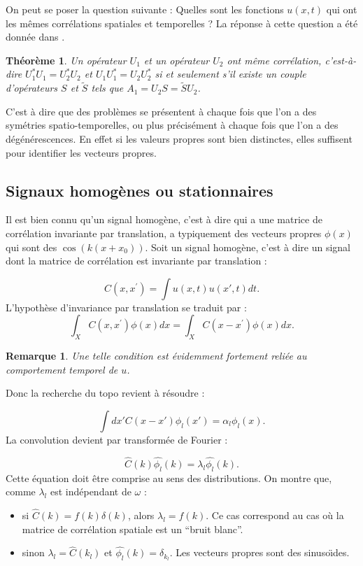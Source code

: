\documentclass{book}
\newtheorem{thm}{Th\'eor\`eme}[chapter]
\newtheorem{rem}{Remarque}[chapter]
\begin{document}
On peut se poser la question suivante :
Quelles sont les fonctions $u(x,t)$ qui ont
les m\^emes corr\'elations spatiales et temporelles ?
La r\'eponse \`a cette question a \'et\'e
donn\'ee dans \cite{Aubry95a}.

\begin{thm}
Un op\'erateur $U_1$ et un op\'erateur $U_2$
ont m\^eme corr\'elation, c'est-\`a-dire
$U^*_1U_1=U^*_2U_2$ et $U_1U^*_1=U_2U^*_2$ si et seulement
s'il existe un couple d'op\'erateurs $S$ et $\tilde S$
tels que
$A_1=U_2S=\tilde SU_2$.
\end{thm}
C'est \`a dire que des probl\`emes se pr\'esentent \`a chaque fois
que l'on a des sym\'etries spatio-temporelles, ou plus
pr\'ecis\'ement \`a chaque fois que l'on a des d\'eg\'en\'erescences.
En effet si les valeurs propres sont bien distinctes, elles suffisent
pour identifier les vecteurs propres.

\subsection{Signaux homog\`enes ou stationnaires}
Il est bien connu \cite{Lumley70} qu'un signal homog\`ene,
c'est \`a dire qui a une matrice de corr\'elation invariante par
translation, a typiquement des vecteurs propres $\phi(x)$ qui sont des
$\cos(k(x+x_0))$.
Soit un signal homog\`ene, c'est \`a dire un signal dont la matrice de
corr\'elation 
est invariante par translation :


\begin{equation}
C(x,x^\prime)=\int u(x,t)u(x',t) dt.
\end{equation}
L'hypoth\`ese d'invariance par translation se traduit par :
\begin{equation}
\int_X C(x,x^\prime)\phi(x)dx=\int_X C(x - x^\prime)\phi(x)dx.
\end{equation}

\begin{rem}
Une telle condition est  \'evidemment fortement reli\'ee au
comportement temporel de $u$.
\end{rem}
Donc la recherche du topo revient \`a r\'esoudre :

\begin{equation}
\int dx' C(x - x')\phi_l(x')=\alpha_l\phi_l(x).
\end{equation}
La convolution devient par transform\'ee de Fourier :


\begin{equation}
\widehat{C}(k)\widehat{\phi_l}(k)=\lambda_l\widehat{\phi_l}(k).
\label{TF}
\end{equation}
Cette \'equation doit \^etre comprise au sens des distributions.
On montre \cite{Petit91} que, comme $\lambda_l$ est ind\'ependant de
$\omega$ : 
\begin{itemize}
\item si $\widehat{C}(k)=f(k)\delta(k)$, alors 
$\lambda_l=f(k)$. Ce cas correspond au cas o\`u la matrice de
corr\'elation 
spatiale est un ``bruit blanc''.
\item sinon  $\lambda_l=\widehat{C}(k_l)$ et
$\widehat{\phi_l}(k)=\delta_{k_l}$. Les vecteurs propres sont des
sinuso\"\i des. 
\end{itemize} 
\end{document}
